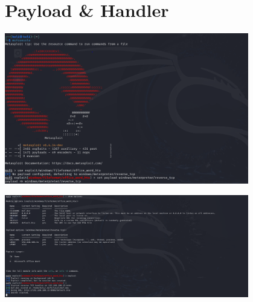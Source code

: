 \section{Payload \& Handler}

\begin{center}
    \includegraphics[width=0.8\textwidth]{Question/SC/4_5_6.PNG}
\end{center}

\vspace{0.15cm}

\begin{center}
    \includegraphics[width=0.8\textwidth]{Question/SC/7_8.PNG}
\end{center}

\vspace{0.35cm}



